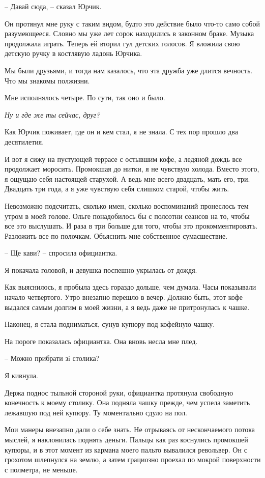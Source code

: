 \documentclass[
]{book}
\begin{document}
-- Давай сюда, -- сказал Юрчик.

Он протянул мне руку с таким видом, будто это действие было что-то само собой разумеющееся. Словно мы уже лет сорок находились в законном браке. Музыка продолжала играть. Теперь ей вторил гул детских голосов. Я вложила свою детскую ручку в костлявую ладонь Юрчика.

Мы были друзьями, и тогда нам казалось, что эта дружба уже длится вечность. Что мы знакомы полжизни.

Мне исполнялось четыре. По сути, так оно и было.

\emph{Ну и где же ты сейчас, друг?}

Как Юрчик поживает, где он и кем стал, я не знала. С тех пор прошло два десятилетия.

И вот я сижу на пустующей террасе с остывшим кофе, а ледяной дождь все продолжает моросить. Промокшая до нитки, я не чувствую холода. Вместо этого, я ощущаю себя настоящей старухой. А ведь мне всего двадцать, мать его, три. Двадцать три года, а я уже чувствую себя слишком старой, чтобы жить.

Невозможно подсчитать, сколько имен, сколько воспоминаний пронеслось тем утром в моей голове. Ольге понадобилось бы с полсотни сеансов на то, чтобы все это выслушать. И раза в три больше для того, чтобы это прокомментировать. Разложить все по полочкам. Объяснить мне собственное сумасшествие.

-- Ще кави? -- спросила официантка.

Я покачала головой, и девушка поспешно укрылась от дождя.

Как выяснилось, я пробыла здесь гораздо дольше, чем думала. Часы показывали начало четвертого. Утро внезапно перешло в вечер. Должно быть, этот кофе выдался самым долгим в моей жизни, а я ведь даже не притронулась к чашке.

Наконец, я стала подниматься, сунув купюру под кофейную чашку.

На пороге показалась официантка. Она вновь несла мне плед.

-- Можно прибрати зi столика?

Я кивнула.

Держа поднос тыльной стороной руки, официантка протянула свободную конечность к моему столику. Она подняла чашку прежде, чем успела заметить лежавшую под ней купюру. Ту моментально сдуло на пол.

Мои манеры внезапно дали о себе знать. Не отрываясь от нескончаемого потока мыслей, я наклонилась поднять деньги. Пальцы как раз коснулись промокшей купюры, и в этот момент из кармана моего пальто вывалился револьвер. Он с грохотом шлепнулся на землю, а затем грациозно проехал по мокрой поверхности с полметра, не меньше.
\end{document}
